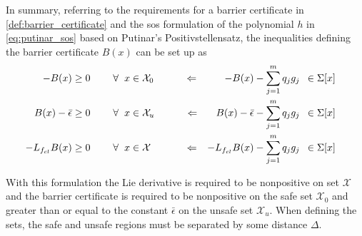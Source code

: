 \begin{defn}\label{def:barrier_sos}
In summary, referring to the requirements for a barrier certificate in \autoref{def:barrier_certificate} and the \gls{sos} formulation of the polynomial $h$ in \autoref{eq:putinar_sos} based on Putinar's Positivstellensatz, the inequalities defining the barrier certificate $B(x)$ can be set up as
\vspace{-2mm}
\begin{subequations}\label{eq:barrier_constraints_putinar}
\begin{flalign}
&&	-B(x) &\geq 0 \hspace{0.8cm}  \forall \hspace{2mm} x \in \mathcal{X}_0 \qquad\quad \Leftarrow& 	-B(x) - \sum _{j=1}^{m}q_jg_j &\,\,\,\in \Sigma[x] &&& \label{cer1_putinar}\\
&&	B(x)-\bar{\epsilon} &\geq 0 \hspace{0.8cm}  \forall \hspace{2mm} x \in \mathcal{X}_u \qquad\quad \Leftarrow& 	B(x)-\bar{\epsilon} - \sum _{j=1}^{m}q_jg_j &\,\,\,\in \Sigma[x] &&&\label{cer2_putinar} \\
&&	-L_{f_{cl}}B(x) &\geq 0 \hspace{0.8cm}  \forall \hspace{2mm} x \in \mathcal{X} \qquad\quad\,\, \Leftarrow& 	-L_{f_{cl}}B(x) - \sum _{j=1}^{m}q_jg_j &\,\,\,\in \Sigma[x] &&& \label{cer3_putinar}
\end{flalign}
\end{subequations}
\end{defn}

With this formulation the Lie derivative is required to be nonpositive on set $\mathcal{X}$ and the barrier certificate is required to be nonpositive on the safe set $\mathcal{X}_0$ and greater than or equal to the constant $\bar{\epsilon}$ on the unsafe set $\mathcal{X}_u$. When defining the sets, the safe and unsafe regions must be separated by some distance $\Delta$.

